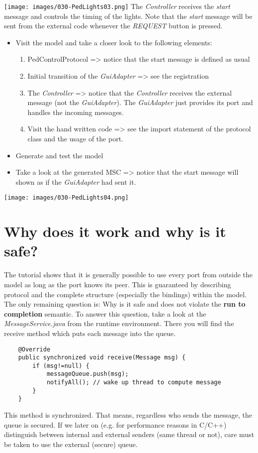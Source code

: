 \texttt{[image: images/030-PedLights03.png]}
The \textit{Controller} receives the \textit{start} message and controls the timing of the lights. Note 
that the \textit{start} message will be sent from the external code whenever the \textit{REQUEST} button 
is pressed.

\begin{itemize}
\item  Visit the model and take a closer look to the following elements:
\begin{enumerate}
\item PedControlProtocol => notice that the start message is defined as usual
\item Initial transition of the \textit{GuiAdapter} => see the registration
\item The \textit{Controller} => notice that the \textit{Controller} receives the external message (not 
the \textit{GuiAdapter}). The \textit{GuiAdapter} just provides its port and handles the incoming messages.
\item Visit the hand written code => see the import statement of the protocol class and the usage of the 
port.
\end{enumerate}
\item Generate and test the model
\item Take a look at the generated MSC => notice that the start message will shown as if the 
\textit{GuiAdapter} had sent it.
\end{itemize}

\texttt{[image: images/030-PedLights04.png]}

\section{Why does it work and why is it safe?}

The tutorial shows that it is generally possible to use every port from outside the model as long as the 
port knows its peer. This is guaranteed by describing protocol and the complete structure (especially the 
bindings) within the model. 
The only remaining question is: Why is it safe and does not violate the \textbf{run to completion} 
semantic. To answer this question, take a look at the \textit{MessageService.java} from the runtime 
environment. There you will find the receive method which puts each message into the queue. 

\begin{verbatim}
    @Override
    public synchronized void receive(Message msg) {
        if (msg!=null) {
            messageQueue.push(msg);
            notifyAll(); // wake up thread to compute message
        }
    }
\end{verbatim}

This method is synchronized. That means, regardless who sends the message, the queue is secured. If we 
later on (e.g. for performance reasons in C/C++) distinguish between internal and external senders (same 
thread or not), care must be taken to use the external (secure) queue.
